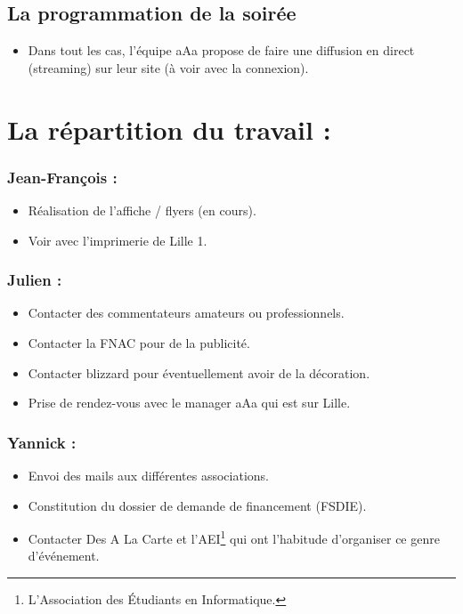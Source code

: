 \subsection{La programmation de la soirée}
\begin{itemize}
\item Dans tout les cas, l'équipe aAa propose de faire une diffusion en direct (streaming) sur leur site (à voir avec la connexion).
\end{itemize}

\section{La répartition du travail :}

\subsubsection{Jean-François :}
\begin{itemize}
\item Réalisation de l'affiche / flyers (en cours).
\item Voir avec l'imprimerie de Lille 1.
\end{itemize}

\subsubsection{Julien :}
\begin{itemize}
\item Contacter des commentateurs amateurs ou professionnels.
\item Contacter la FNAC pour de la publicité.
\item Contacter blizzard pour éventuellement avoir de la décoration.
\item Prise de rendez-vous avec le manager aAa qui est sur Lille.
\end{itemize}

\subsubsection{Yannick :}
\begin{itemize}
\item Envoi des mails aux différentes associations.
\item Constitution du dossier de demande de financement (FSDIE).
\item Contacter \og Des A La Carte \fg{} et l'AEI\footnote{L'Association des Étudiants en Informatique.} qui ont l'habitude d'organiser ce genre d’événement.
\end{itemize}

